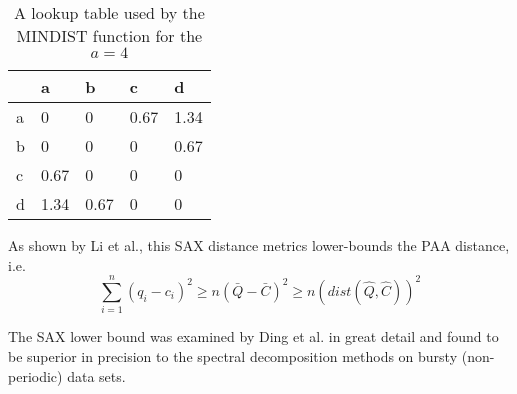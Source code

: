 \begin{table}
\begin{tabularx}{400pt}{X X X X X}
\hline
   & a   & b    & c    & d    \\
\hline
a & 0    & 0    & 0.67 & 1.34 \\
b & 0    & 0    & 0    & 0.67 \\
c & 0.67 & 0    & 0    & 0    \\
d & 1.34 & 0.67 & 0    & 0    \\
\hline
\end{tabularx}
\caption{A lookup table used by the MINDIST function for the $a=4$}
\label{tbl:sax_lookup}
\end{table}

As shown by Li et al., this SAX distance metrics lower-bounds the PAA distance, i.e.
\begin{equation}
\sum_{i=1}^{n} (q_{i} - c_{i})^{2} \geq n(\bar{Q} - \bar{C})^{2} \geq n(dist(\hat{Q},\hat{C}))^2
\label{eq:sax_bounding}
\end{equation}

The SAX lower bound was examined by Ding et al. \cite{citeulike:4501572} in great detail and found to be superior in precision to the spectral decomposition methods on bursty (non-periodic) data sets.

